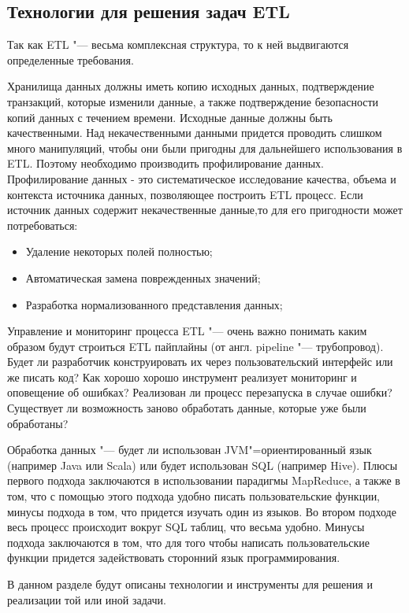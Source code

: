 \documentclass[bachelor, och, pract]{SCWorks}
\begin{document}
\subsection{Технологии для решения задач ETL}
Так как  ETL "--- весьма комплексная структура, то к ней выдвигаются определенные требования.

Хранилища данных должны иметь копию исходных данных, подтверждение транзакций, которые изменили данные, а также подтверждение безопасности копий данных с течением времени.
Исходные данные должны быть качественными. Над некачественными данными придется проводить слишком много манипуляций, чтобы они были пригодны для дальнейшего использования в ETL. Поэтому необходимо производить профилирование данных. Профилирование данных - это систематическое исследование качества, объема и контекста источника данных, позволяющее построить  ETL процесс. Если источник данных содержит некачественные данные,то для его пригодности может потребоваться:

\begin{itemize}
	\item Удаление некоторых полей полностью;
	\item Автоматическая замена поврежденных значений;
	\item Разработка нормализованного представления данных;
\end{itemize}

Управление и мониторинг процесса ETL "--- очень важно понимать каким образом будут строиться ETL пайплайны (от англ. pipeline "--- трубопровод). Будет ли разработчик конструировать их через пользовательский интерфейс или же писать код? Как хорошо хорошо инструмент реализует мониторинг и оповещение об ошибках? Реализован ли процесс перезапуска в случае ошибки? Существует ли возможность заново обработать данные, которые уже были обработаны?

Обработка данных "--- будет ли использован JVM"=ориентированный язык (например Java или Scala) или будет использован SQL (например Hive). Плюсы первого подхода заключаются в использовании парадигмы MapReduce, а также в том, что с помощью этого подхода удобно писать пользовательские функции, минусы подхода в том, что придется изучать один из языков. Во втором подходе весь процесс происходит вокруг SQL таблиц, что весьма удобно. Минусы подхода заключаются в том, что для того чтобы написать пользовательские функции придется задействовать сторонний язык программирования.

В данном разделе будут описаны технологии и инструменты для решения и реализации той или иной задачи.
\end{document}
